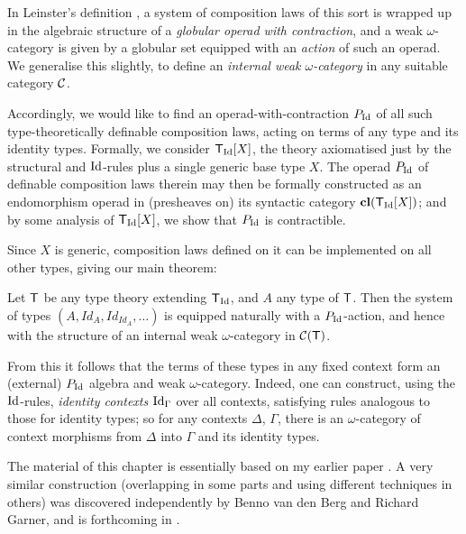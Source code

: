 \begin{para}In Leinster's definition \cite{leinster:book}, a system of composition laws of this sort is wrapped up in the algebraic structure of a \emph{globular operad with contraction}, and a weak $\omega$-category is given by a globular set equipped with an \emph{action} of such an operad.  We generalise this slightly, to define an \emph{internal weak $\omega$-category} in any suitable category $\mathcal{C}$.

Accordingly, we would like to find an operad-with-contraction $P_{\mathrm{Id}}$ of all such type-theoretically definable composition laws, acting on terms of any type and its identity types.  Formally, we consider $\mathsf{T}_{\mathrm{Id}}[X]$, the theory axiomatised just by the structural and $\mathrm{Id}$-rules plus a single generic base type $X$.  The operad $P_{\mathrm{Id}}$ of definable composition laws therein may then be formally constructed as an endomorphism operad in (presheaves on) its syntactic category $\mathbf{cl}(\mathsf{T}_{\mathrm{Id}} [X])$; and by some analysis of $\mathsf{T}_{\mathrm{Id}}[X]$, we show that $P_{\mathrm{Id}}$ is contractible.
\end{para}

Since $X$ is generic, composition laws defined on it can be implemented on all other types, giving our main theorem:  

\begin{theorem}Let $\mathsf{T}$ be any type theory extending $\mathsf{T}_{\mathrm{Id}}$, and $A$ any type of $\mathsf{T}$.  Then the system of types $(A, Id_A, Id_{Id_A}, \ldots)$ is equipped naturally with a $P_{\mathrm{Id}}$-action, and hence with the structure of an internal weak $\omega$-category in $\mathcal{C}(\mathsf{T})$.
\end{theorem}

From this it follows that the terms of these types in any fixed context form an (external) $P_{\mathrm{Id}}$ algebra and weak $\omega$-category.  Indeed, one can construct, using the $\mathrm{Id}$-rules, \emph{identity contexts} $\mathrm{Id}_\Gamma$ over all contexts, satisfying rules analogous to those for identity types; so for any contexts $\Delta$, $\Gamma$, there is an $\omega$-category of context morphisms from $\Delta$ into $\Gamma$ and its identity types.

The material of this chapter is essentially based on my earlier paper \cite{lumsdaine:lmcs}.  A very similar construction (overlapping in some parts and using different techniques in others)  was discovered independently by Benno van den Berg and Richard Garner, and is forthcoming in \cite{garner-van-den-berg}. \\

